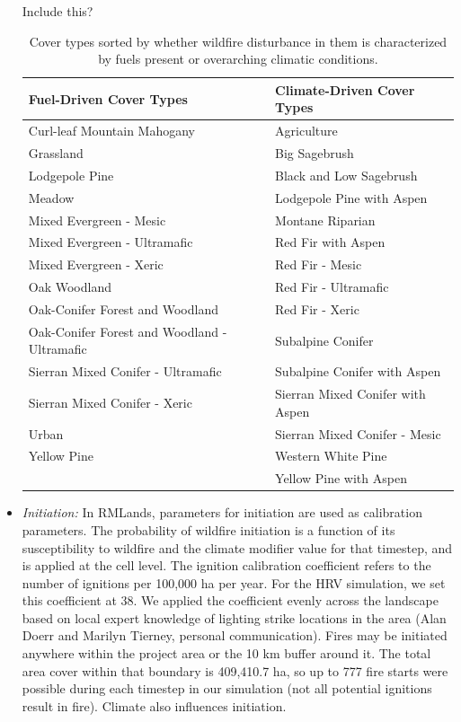 \begin{itemize}
Include this?
\begin{table}[htbp]
\small
\centering
\caption{Cover types sorted by whether wildfire disturbance in them is characterized by fuels present or overarching climatic conditions.}
\label{howdriven}
\begin{tabular}{ll}
\hline
\textbf{Fuel-Driven Cover Types} 				& \textbf{Climate-Driven Cover Types}	\\
\hline
Curl-leaf Mountain Mahogany 					& Agriculture   						\\
Grassland     									& Big Sagebrush 						\\
Lodgepole Pine    								& Black and Low Sagebrush				\\
Meadow											& Lodgepole Pine with Aspen 			\\
Mixed Evergreen - Mesic							& Montane Riparian						\\
Mixed Evergreen - Ultramafic     				& Red Fir with Aspen   					\\
Mixed Evergreen - Xeric 						& Red Fir - Mesic    					\\
Oak Woodland 									& Red Fir - Ultramafic 					\\
Oak-Conifer Forest and Woodland 				& Red Fir - Xeric 						\\ 	
Oak-Conifer Forest and Woodland - Ultramafic 	& Subalpine Conifer 					\\
Sierran Mixed Conifer - Ultramafic 				& Subalpine Conifer with Aspen 			\\
Sierran Mixed Conifer - Xeric 					& Sierran Mixed Conifer with Aspen 		\\
Urban 											& Sierran Mixed Conifer - Mesic 		\\
Yellow Pine 									& Western White Pine 					\\
												& Yellow Pine with Aspen 				\\
\hline
\end{tabular}
\end{table}



\item \emph{Initiation:} In RMLands, parameters for initiation are used as calibration parameters. The probability of wildfire initiation is a function of its susceptibility to wildfire and the climate modifier value for that timestep, and is applied at the cell level. The ignition calibration coefficient refers to the number of ignitions per 100,000 ha per year. For the HRV simulation, we set this coefficient at 38. We applied the coefficient evenly across the landscape based on local expert knowledge of lighting strike locations in the area (Alan Doerr and Marilyn Tierney, personal communication). Fires may be initiated anywhere within the project area or the 10 km buffer around it. The total area cover within that boundary is 409,410.7 ha, so up to 777 fire starts were possible during each timestep in our simulation (not all potential ignitions result in fire). Climate also influences initiation.


\end{itemize}
